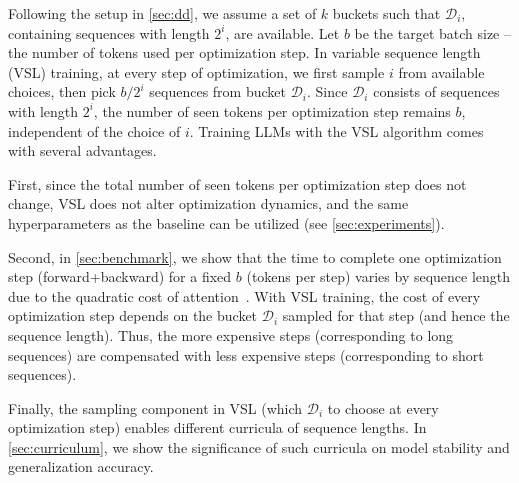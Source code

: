 Following the setup in \cref{sec:dd}, we assume a set of $k$ buckets such that $\mathcal{D}_i$, containing sequences with length $2^i$, are available. Let $b$ be the target batch size -- the number of tokens used per optimization step. In variable sequence length (VSL) training, at every step of optimization, we first sample $i$ from available choices, then pick $b / 2^i$ sequences from bucket $\mathcal{D}_i$. Since $\mathcal{D}_i$ consists of sequences with length $2^i$, the number of seen tokens per optimization step remains $b$, independent of the choice of $i$. Training LLMs with the VSL algorithm comes with several advantages.


First, since the total number of seen tokens per optimization step does not change, VSL does not alter optimization dynamics, and the same hyperparameters as the baseline can be utilized (see \cref{sec:experiments}).

Second, in \cref{sec:benchmark}, we show that the time to complete one optimization step (forward+backward) for a fixed $b$ (tokens per step) varies by sequence length due to the quadratic cost of attention~\citep{vaswani2017attention}. With VSL training, the cost of every optimization step depends on the bucket $\mathcal{D}_i$ sampled for that step (and hence the sequence length). Thus, the more expensive steps (corresponding to long sequences) are compensated with less expensive steps (corresponding to short sequences).

Finally, the sampling component in VSL (which $\mathcal{D}_i$ to choose at every optimization step) enables different curricula of sequence lengths. In \cref{sec:curriculum}, we show the significance of such curricula on model stability and generalization accuracy.
